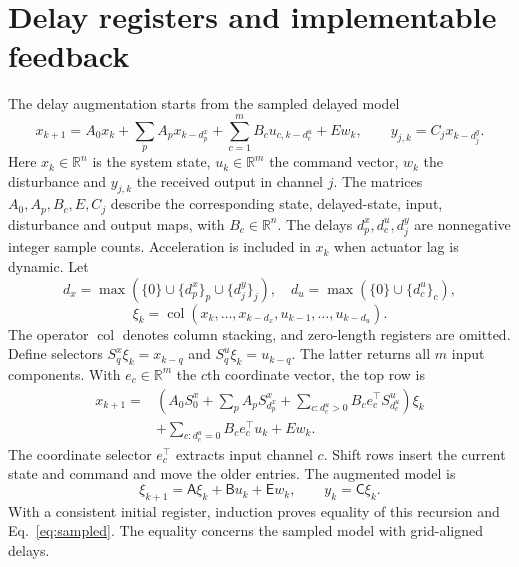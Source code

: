 \documentclass[11pt]{article}
\begin{document}
\section{Delay registers and implementable feedback}
The delay augmentation starts from the sampled delayed model
\begin{equation}
x_{k+1}=A_0x_k+\sum_p A_px_{k-d_p^x}
+\sum_{c=1}^{m} B_c u_{c,k-d_c^u}+Ew_k,
\qquad y_{j,k}=C_jx_{k-d_j^y}.
\label{eq:sampled}
\end{equation}
Here $x_k\in\mathbb R^n$ is the system state, $u_k\in\mathbb R^m$ the command vector, $w_k$ the disturbance and $y_{j,k}$ the received output in channel $j$. The matrices $A_0,A_p,B_c,E,C_j$ describe the corresponding state, delayed-state, input, disturbance and output maps, with $B_c\in\mathbb R^n$. The delays $d_p^x,d_c^u,d_j^y$ are nonnegative integer sample counts. Acceleration is included in $x_k$ when actuator lag is dynamic. Let
\begin{equation}
d_x=\max(\{0\}\cup\{d_p^x\}_p\cup\{d_j^y\}_j),\quad
 d_u=\max(\{0\}\cup\{d_c^u\}_c),
\end{equation}
\begin{equation}
\xi_k=\operatorname{col}(x_k,\ldots,x_{k-d_x},u_{k-1},\ldots,u_{k-d_u}).
\end{equation}
The operator $\operatorname{col}$ denotes column stacking, and zero-length registers are omitted. Define selectors $S_q^x\xi_k=x_{k-q}$ and $S_q^u\xi_k=u_{k-q}$. The latter returns all $m$ input components. With $e_c\in\mathbb R^m$ the $c$th coordinate vector, the top row is
\begin{align}
x_{k+1}={}&\left(A_0S_0^x+\sum_p A_pS_{d_p^x}^x
+\sum_{c:d_c^u>0}B_c e_c^\top S_{d_c^u}^u\right)\xi_k\nonumber\\
&+\sum_{c:d_c^u=0}B_ce_c^\top u_k+Ew_k.
\label{eq:top}
\end{align}
The coordinate selector $e_c^\top$ extracts input channel $c$. Shift rows insert the current state and command and move the older entries. The augmented model is
\begin{equation}
\xi_{k+1}=\mathsf A\xi_k+\mathsf Bu_k+\mathsf Ew_k,\qquad y_k=\mathsf C\xi_k.
\label{eq:lift}
\end{equation}
With a consistent initial register, induction proves equality of this recursion and Eq.~\eqref{eq:sampled}. The equality concerns the sampled model with grid-aligned delays.
\end{document}
